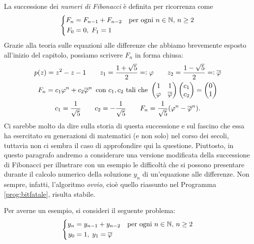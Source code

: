 La successione dei \emph{numeri di Fibonacci} è definita per ricorrenza come
\[
\left\{
\begin{aligned}
F_n &= F_{n-1} + F_{n-2} \quad \text{per ogni $n \in \mathbb{N}$, $n \geq 2$} \\
F_0 &= 0, \; F_1 = 1
\end{aligned}
\right.
\]
Grazie alla teoria sulle equazioni alle differenze che abbiamo brevemente
esposto all'inizio del capitolo, possiamo scrivere $F_n$ in forma chiusa:
\begin{gather*}
p(z) = z^2-z-1
\qquad z_1 = \frac{1+\sqrt{5}}{2} \eqd \varphi
\qquad z_2 = \frac{1-\sqrt{5}}{2} \eqd \overline{\varphi} \\
%
F_n = c_1 \varphi^n + c_2 \overline{\varphi}^n
\, \text{ con $c_1,c_2$ tali che }
\begin{pmatrix}
1 & 1 \\ 
\varphi & \overline{\varphi}
\end{pmatrix}
\begin{pmatrix} c_1 \\ c_2 \end{pmatrix}
= \begin{pmatrix} 0 \\ 1 \end{pmatrix} \\
%
c_1 = \frac{1}{\sqrt{5}}
\qquad c_2 = -\frac{1}{\sqrt{5}}
\qquad F_n = \frac{1}{\sqrt{5}} (\varphi^n - \overline{\varphi}^n).
\end{gather*}
Ci sarebbe molto da dire sulla storia di questa successione
e sul fascino che essa ha esercitato su generazioni di matematici (e non solo)
nel corso dei secoli, tuttavia non ci sembra il caso di approfondire qui
la questione.
Piuttosto, in questo paragrafo andremo a considerare una versione modificata
della successione di Fibonacci per illustrare con un esempio
le difficoltà che si possono presentare durante il calcolo numerico
della soluzione $y_n$ di un'equazione alle differenze.
Non sempre, infatti, l'algoritmo \emph{ovvio}, cioè quello
riassunto nel Programma \ref{prog:bitfatale}, risulta stabile.
%

%
Per averne un esempio, si consideri il seguente problema:
\begin{equation} \label{eq:fibonacci-modificata}
\left\{
\begin{aligned}
y_n &= y_{n-1} + y_{n-2} \quad \text{per ogni $n \in \mathbb{N}$, $n \geq 2$} \\
y_0 &= 1, \; y_1 = \overline{\varphi}
\end{aligned}
\right.
\end{equation}
